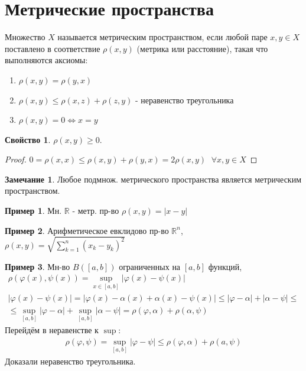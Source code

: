 \documentclass{article}
\theoremstyle{definition}
\numberwithin{theorem}{section}
\numberwithin{lemma}{section}
\numberwithin{definition}{section}
\numberwithin{corollary}{section}
\newtheorem*{eg}{Пример}
\newtheorem*{remark}{Замечание}
\newtheorem*{property}{Свойство}
\numberwithin{equation}{section}
\let\phi\varphi
\let\iff\Leftrightarrow
\newcommand\R{\ensuremath{\mathbb{R}}}
\begin{document}
\section{Метрические пространства}
\begin{definition}
  Множество $X$ называется метрическим пространством,
  если любой паре $x,y\in X$ поставлено в соответствие $\rho(x,y)$ (метрика или расстояние),
  такая что выполняются аксиомы:
  \begin{enumerate}
    \item $\rho(x,y)=\rho(y,x)$
    \item $\rho(x,y) \le \rho(x,z)+\rho(z,y)$ - неравенство треугольника
    \item $\rho(x,y)=0 \iff x=y$
  \end{enumerate}
\end{definition}
\begin{property}
  $\rho(x,y) \ge 0$.
\end{property} 
\begin{proof}
  $0=\rho(x,x) \le \rho(x,y)+\rho(y,x)=2\rho(x,y) \;$ $\forall x,y\in X$
\end{proof}
\begin{remark}
  Любое подмнож. метрического пространства является метрическим пространством.
\end{remark}
\begin{eg}
  Мн. $\R$ - метр. пр-во $\rho(x,y)=|x-y|$
\end{eg}
\begin{eg}
  Арифметическое евклидово пр-во $\R^{n}$, $\rho(x,y)=\sqrt{\sum_{k=1}^{n}(x_k-y_k)^{2}}$
\end{eg}
\begin{eg}
  Мн-во $B([a,b])$ ограниченных на $[a,b]$ функций,
  \begin{gather*}
    \rho(\phi(x), \psi(x))=\sup \limits_{x\in[a,b]}|\phi(x)-\psi(x)| \\ 
    |\phi(x)-\psi(x)|=|\phi(x)-\alpha(x)+\alpha(x)-\psi(x)|
    \le |\phi - \alpha| + |\alpha - \psi| \le\\
    \le \sup \limits_{[a,b]}|\phi-\alpha| + \sup \limits_{[a,b]}|\alpha-\psi| 
    =\rho(\phi,\alpha)+\rho(\alpha,\psi)
  \end{gather*}
  Перейдём в неравенстве к $\sup$:
  \begin{gather*}
  \rho(\phi,\psi)=\sup \limits_{[a,b]}|\phi -\psi| \le \rho(\phi,\alpha)+\rho(a,\psi)
  \end{gather*}
  Доказали неравенство треугольника.
\end{eg}
\end{document}
